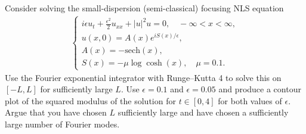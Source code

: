 \documentclass[12pt]{report}
\begin{document}
\newpage



\begin{problem}
    Consider solving the small-dispersion (semi-classical) focusing NLS equation
    \begin{align*}
        \begin{cases}
            i \epsilon u_t + \frac{\epsilon^2}{2} u_{xx} + |u|^2 u = 0, \quad -\infty < x < \infty,\\
            u(x,0) = A(x) e^{i S(x)/\epsilon},\\
            A(x) = - \mathrm{sech}(x),\\
            S(x) = - \mu \log \cosh (x), \quad \mu = 0.1.
        \end{cases}
    \end{align*}
    Use the Fourier exponential integrator with Runge--Kutta 4 to solve this on $[-L, L]$ for sufficiently large $L$.  Use $\epsilon = 0.1$ and $\epsilon = 0.05$ and produce a contour plot of the squared modulus of the solution for $t \in [0,4]$ for both values of $\epsilon$.  Argue that you have chosen $L$ sufficiently large and have chosen a sufficiently large number of Fourier modes.
    
\end{problem}

\def\D{{\mathcal{D}}}
\def\c{{\check{c}}}
\newcommand{\mat}[1]{\begin{bmatrix}
    \\ #1 \\ \\
\end{bmatrix}}
\end{document}
